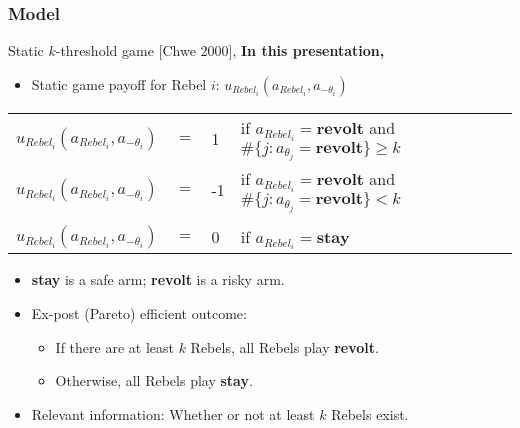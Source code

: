 \documentclass[9pt]{beamer}
\begin{document}



\begin{frame}[label=static_game]
  \frametitle{Model}
Static $k$-threshold game [Chwe 2000], {\textbf{In this presentation,}} \hyperlink{alt_static_game}{}

  \begin{itemize}
 
  \item Static game payoff for Rebel $i$: $u_{Rebel_i}(a_{Rebel_i},a_{-\theta_i})$

\end{itemize}
  \begin{table}[h]
\begin{tabular}{llll}
$u_{Rebel_i}(a_{Rebel_i},a_{-\theta_i})$ & $=$ & 1 & if $a_{Rebel_i}=\textbf{revolt}$ and $\#\{j:a_{\theta_j}=\textbf{revolt}\}\geq k$ \\
$u_{Rebel_i}(a_{Rebel_i},a_{-\theta_i})$ & $=$ & -1 & if $a_{Rebel_i}=\textbf{revolt}$ and $\#\{j:a_{\theta_j}=\textbf{revolt}\}< k$ \pause \\
\\
$u_{Rebel_i}(a_{Rebel_i},a_{-\theta_i})$ & $=$ & 0 & if $a_{Rebel_i}=\textbf{stay}$ \pause \\
\end{tabular}

\end{table}

  \begin{itemize}
\item \textbf{stay} is a safe arm; \textbf{revolt} is a risky arm. \pause
\item Ex-post (Pareto) efficient outcome:
\begin{itemize}
\item If there are at least $k$ Rebels, all Rebels play \textbf{revolt}.
\item Otherwise, all Rebels play \textbf{stay}.
\end{itemize}

\pause
\item Relevant information: Whether or not at least $k$ Rebels exist.


  \end{itemize}

\end{frame}
\end{document}
